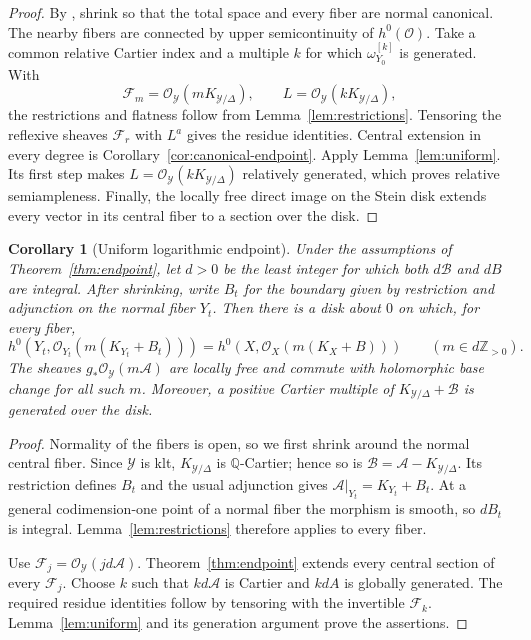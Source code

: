 \documentclass[11pt,a4paper]{article}
\numberwithin{equation}{section}
\newtheorem{corollary}[theorem]{Corollary}
\theoremstyle{definition}
\theoremstyle{remark}
\newcommand{\OO}{\mathcal O}\newcommand{\cX}{\mathcal X}
\begin{document}
\begin{proof}
By \cite[Lemma~10 and Remark~10.3]{Kollar2021}, shrink so that the
total space and every fiber are normal canonical. The nearby fibers
are connected by upper semicontinuity of $h^0(\OO)$.
Take a common relative Cartier index and a multiple $k$ for which
$\omega_{Y_0}^{[k]}$ is generated. With
\[
 \mathcal F_m=\OO_{\mathcal Y}(mK_{\mathcal Y/\Delta}),
 \qquad L=\OO_{\mathcal Y}(kK_{\mathcal Y/\Delta}),
\]
the restrictions and flatness follow from
Lemma~\ref{lem:restrictions}. Tensoring the reflexive sheaves
$\mathcal F_r$ with $L^a$ gives the residue identities. Central extension
in every degree is Corollary~\ref{cor:canonical-endpoint}.
Apply Lemma~\ref{lem:uniform}. Its first step makes
$L=\OO_{\mathcal Y}(kK_{\mathcal Y/\Delta})$ relatively generated,
which proves relative semiampleness. Finally, the locally free
direct image on the Stein disk extends every vector in its central
fiber to a section over the disk.
\end{proof}


\begin{corollary}[Uniform logarithmic endpoint]
\label{cor:uniform-log-endpoint}
Under the assumptions of Theorem~\ref{thm:endpoint}, let
$d>0$ be the least integer for which both $d\mathcal B$ and $dB$ are integral.
After shrinking, write $B_t$ for the boundary given by
restriction and adjunction on the normal fiber $Y_t$.
Then there is a disk about $0$ on which, for every fiber,
\[
 h^0(Y_t,\OO_{Y_t}(m(K_{Y_t}+B_t)))
 =h^0(X,\OO_X(m(K_X+B)))\qquad(m\in d\mathbb Z_{>0}).
\]
The sheaves $g_*\OO_{\mathcal Y}(m\mathcal A)$ are locally free
and commute with holomorphic base change for all such $m$.
Moreover, a positive Cartier
multiple of $K_{\mathcal Y/\Delta}+\mathcal B$ is generated
over the disk.
\end{corollary}

\begin{proof}
Normality of the fibers is open, so we first shrink around the
normal central fiber. Since $\mathcal Y$ is klt,
$K_{\mathcal Y/\Delta}$ is $\mathbb Q$-Cartier; hence so is
$\mathcal B=\mathcal A-K_{\mathcal Y/\Delta}$.
Its restriction defines $B_t$ and the usual adjunction gives
$\mathcal A|_{Y_t}=K_{Y_t}+B_t$.
At a general codimension-one point of a normal fiber the
morphism is smooth, so $dB_t$ is integral.
Lemma~\ref{lem:restrictions} therefore applies to every fiber.

Use $\mathcal F_j=\OO_{\mathcal Y}(jd\mathcal A)$.
Theorem~\ref{thm:endpoint} extends every central section of
every $\mathcal F_j$. Choose $k$ such that $kd\mathcal A$
is Cartier and $kdA$ is globally generated. The required
residue identities follow by tensoring with the invertible
$\mathcal F_k$. Lemma~\ref{lem:uniform} and its generation
argument prove the assertions.
\end{proof}
\end{document}
